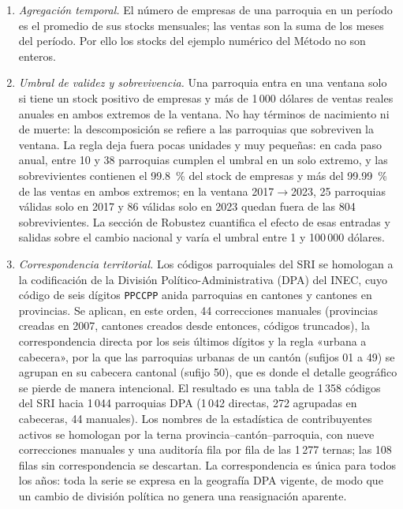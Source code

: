 \documentclass[12pt,a4paper]{article}
\begin{document}
\begin{enumerate}[label=\arabic*.,leftmargin=0.5in,labelwidth=0.25in,labelsep=0pt,align=left,itemsep=6pt,parsep=0pt,topsep=0pt]
  \item \textit{Agregación temporal.} El número de empresas de una parroquia en un período es el promedio de sus stocks mensuales; las ventas son la suma de los meses del período. Por ello los stocks del ejemplo numérico del Método no son enteros.
  \item \textit{Umbral de validez y sobrevivencia.} Una parroquia entra en una ventana solo si tiene un stock positivo de empresas y más de 1\,000 dólares de ventas reales anuales en ambos extremos de la ventana. No hay términos de nacimiento ni de muerte: la descomposición se refiere a las parroquias que sobreviven la ventana. La regla deja fuera pocas unidades y muy pequeñas: en cada paso anual, entre 10 y 38 parroquias cumplen el umbral en un solo extremo, y las sobrevivientes contienen el 99.8~\% del stock de empresas y más del 99.99~\% de las ventas en ambos extremos; en la ventana 2017$\to$2023, 25 parroquias válidas solo en 2017 y 86 válidas solo en 2023 quedan fuera de las 804 sobrevivientes. La sección de Robustez cuantifica el efecto de esas entradas y salidas sobre el cambio nacional y varía el umbral entre 1 y 100\,000 dólares.
  \item \textit{Correspondencia territorial.} Los códigos parroquiales del SRI se homologan a la codificación de la División Político-Administrativa (DPA) del INEC, cuyo código de seis dígitos \texttt{PPCCPP} anida parroquias en cantones y cantones en provincias. Se aplican, en este orden, 44 correcciones manuales (provincias creadas en 2007, cantones creados desde entonces, códigos truncados), la correspondencia directa por los seis últimos dígitos y la regla «urbana a cabecera», por la que las parroquias urbanas de un cantón (sufijos 01 a 49) se agrupan en su cabecera cantonal (sufijo 50), que es donde el detalle geográfico se pierde de manera intencional. El resultado es una tabla de 1\,358 códigos del SRI hacia 1\,044 parroquias DPA (1\,042 directas, 272 agrupadas en cabeceras, 44 manuales). Los nombres de la estadística de contribuyentes activos se homologan por la terna provincia--cantón--parroquia, con nueve correcciones manuales y una auditoría fila por fila de las 1\,277 ternas; las 108 filas sin correspondencia se descartan. La correspondencia es única para todos los años: toda la serie se expresa en la geografía DPA vigente, de modo que un cambio de división política no genera una reasignación aparente.

\end{enumerate}
\end{document}

